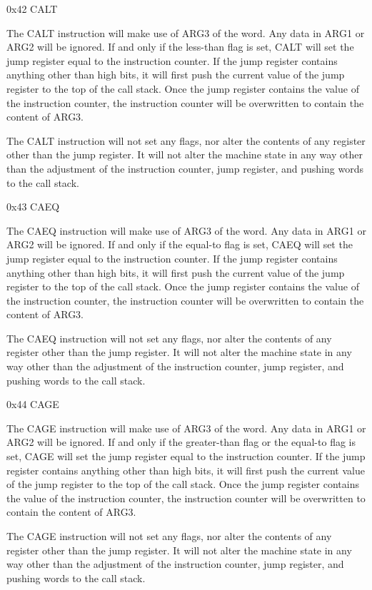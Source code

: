 \documentclass[]{article}
\begin{document}
0x42 CALT

The CALT instruction will make use of ARG3 of the word. Any data in ARG1
or ARG2 will be ignored. If and only if the less-than flag is set, CALT
will set the jump register equal to the instruction counter. If the jump
register contains anything other than high bits, it will first push the
current value of the jump register to the top of the call stack. Once
the jump register contains the value of the instruction counter, the
instruction counter will be overwritten to contain the content of ARG3.

The CALT instruction will not set any flags, nor alter the contents of
any register other than the jump register. It will not alter the machine
state in any way other than the adjustment of the instruction counter,
jump register, and pushing words to the call stack.

0x43 CAEQ

The CAEQ instruction will make use of ARG3 of the word. Any data in ARG1
or ARG2 will be ignored. If and only if the equal-to flag is set, CAEQ
will set the jump register equal to the instruction counter. If the jump
register contains anything other than high bits, it will first push the
current value of the jump register to the top of the call stack. Once
the jump register contains the value of the instruction counter, the
instruction counter will be overwritten to contain the content of ARG3.

The CAEQ instruction will not set any flags, nor alter the contents of
any register other than the jump register. It will not alter the machine
state in any way other than the adjustment of the instruction counter,
jump register, and pushing words to the call stack.

0x44 CAGE

The CAGE instruction will make use of ARG3 of the word. Any data in ARG1
or ARG2 will be ignored. If and only if the greater-than flag or the
equal-to flag is set, CAGE will set the jump register equal to the
instruction counter. If the jump register contains anything other than
high bits, it will first push the current value of the jump register to
the top of the call stack. Once the jump register contains the value of
the instruction counter, the instruction counter will be overwritten to
contain the content of ARG3.

The CAGE instruction will not set any flags, nor alter the contents of
any register other than the jump register. It will not alter the machine
state in any way other than the adjustment of the instruction counter,
jump register, and pushing words to the call stack.
\end{document}
